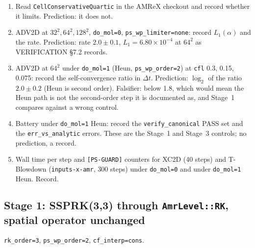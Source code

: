 \documentclass[11pt,a4paper]{article}
\newcommand{\code}[1]{\texttt{\small #1}}
\newcommand{\Dt}{\Delta t}
\begin{document}
\begin{enumerate}[nosep]
\item Read \code{CellConservativeQuartic} in the AMReX checkout and record
      whether it limits.  Prediction: it does not.
\item ADV2D at $32^2, 64^2, 128^2$, \code{do\_mol=0}, \code{ps\_wp\_limiter=none}:
      record $L_1(\alpha)$ and the rate.  Prediction: rate $2.0\pm0.1$,
      $L_1=6.80\times10^{-4}$ at $64^2$ as VERIFICATION \S7.2 records.
\item ADV2D at $64^2$ under \code{do\_mol=1} (Heun, \code{ps\_wp\_order=2})
      at \code{cfl} 0.3, 0.15, 0.075: record the self-convergence ratio in
      $\Dt$.  Prediction: $\log_2$ of the ratio $2.0\pm0.2$ (Heun is second
      order).  Falsifier: below 1.8, which would mean the Heun path is not
      the second-order step it is documented as, and Stage~1 compares
      against a wrong control.
\item Battery under \code{do\_mol=1} Heun: record the \code{verify\_canonical}
      PASS set and the \code{err\_vs\_analytic} errors.  These are the
      Stage~1 and Stage~3 controls; no prediction, a record.
\item Wall time per step and \code{[PS-GUARD]} counters for XC2D (40
      steps) and T-Blowdown (\code{inputs-x-amr}, 300 steps) under
      \code{do\_mol=0} and under \code{do\_mol=1} Heun.  Record.
\end{enumerate}

\subsection*{Stage 1: SSPRK(3,3) through \code{AmrLevel::RK}, spatial operator unchanged}

\code{rk\_order=3}, \code{ps\_wp\_order=2}, \code{cf\_interp=cons}.
\end{document}
